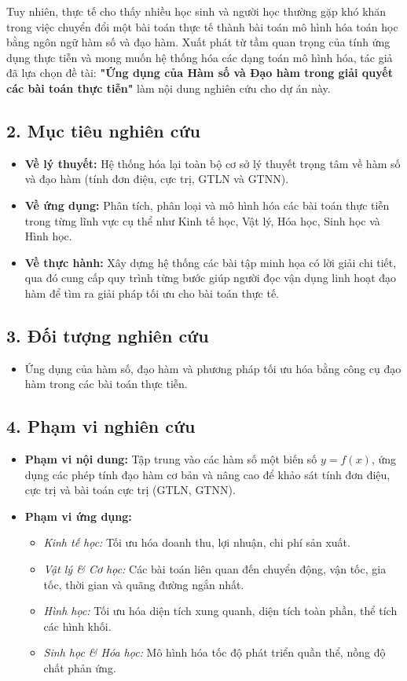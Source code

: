 \documentclass[12pt,a4paper]{article}
\begin{document}
Tuy nhiên, thực tế cho thấy nhiều học sinh và người học thường gặp khó khăn trong việc chuyển đổi một bài toán thực tế thành bài toán mô hình hóa toán học bằng ngôn ngữ hàm số và đạo hàm. Xuất phát từ tầm quan trọng của tính ứng dụng thực tiễn và mong muốn hệ thống hóa các dạng toán mô hình hóa, tác giả đã lựa chọn đề tài: \textbf{"Ứng dụng của Hàm số và Đạo hàm trong giải quyết các bài toán thực tiễn"} làm nội dung nghiên cứu cho dự án này.

\subsection*{2. Mục tiêu nghiên cứu}
\begin{itemize}
    \item \textbf{Về lý thuyết:} Hệ thống hóa lại toàn bộ cơ sở lý thuyết trọng tâm về hàm số và đạo hàm (tính đơn điệu, cực trị, GTLN và GTNN).
    \item \textbf{Về ứng dụng:} Phân tích, phân loại và mô hình hóa các bài toán thực tiễn trong từng lĩnh vực cụ thể như Kinh tế học, Vật lý, Hóa học, Sinh học và Hình học.
    \item \textbf{Về thực hành:} Xây dựng hệ thống các bài tập minh họa có lời giải chi tiết, qua đó cung cấp quy trình từng bước giúp người đọc vận dụng linh hoạt đạo hàm để tìm ra giải pháp tối ưu cho bài toán thực tế.
\end{itemize}

\subsection*{3. Đối tượng nghiên cứu}
\begin{itemize}
    \item Ứng dụng của hàm số, đạo hàm và phương pháp tối ưu hóa bằng công cụ đạo hàm trong các bài toán thực tiễn.
\end{itemize}

\subsection*{4. Phạm vi nghiên cứu}
\begin{itemize}
    \item \textbf{Phạm vi nội dung:} Tập trung vào các hàm số một biến số $y = f(x)$, ứng dụng các phép tính đạo hàm cơ bản và nâng cao để khảo sát tính đơn điệu, cực trị và bài toán cực trị (GTLN, GTNN).
    \item \textbf{Phạm vi ứng dụng:}
    \begin{itemize}
        \item \textit{Kinh tế học:} Tối ưu hóa doanh thu, lợi nhuận, chi phí sản xuất.
        \item \textit{Vật lý & Cơ học:} Các bài toán liên quan đến chuyển động, vận tốc, gia tốc, thời gian và quãng đường ngắn nhất.
        \item \textit{Hình học:} Tối ưu hóa diện tích xung quanh, diện tích toàn phần, thể tích các hình khối.
        \item \textit{Sinh học & Hóa học:} Mô hình hóa tốc độ phát triển quần thể, nồng độ chất phản ứng.
    \end{itemize}
\end{itemize}
\end{document}
